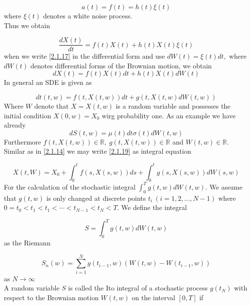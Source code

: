 \documentclass[a4 paper, 12pt]{report}
\theoremstyle{plain}
\begin{document}
\begin{equation}\label{2.1.16}
a(t)  = f(t)=h(t)\xi(t)
\end{equation}
where $\xi(t)$ denotes a white noise process.\\
Thus we obtain

\begin{equation}\label{2.1.17}
\frac{dX(t)}{dt} = f(t)X(t)+h(t)X(t)\xi(t)
\end{equation}
when we write \eqref{2.1.17} in the differential form and use $dW(t) = \xi(t)dt,$ where $dW(t)$ denotes differential forms of the Brownian motion, we obtain
\begin{equation}\label{2.1.18}
dX(t) = f(t)X(t)dt+h(t)X(t)dW(t)
\end{equation}
In general an SDE is given as


\begin{equation}\label{2.1.19}
dt(t,w) = f(t,X(t,w))dt+g(t,X(t,w)dW(t,w))
\end{equation}
Where $W$ denote that $X = X(t,w)$ is a random variable and possesses the initial condition $X(0,w) = X_0$ wirg probability one. As an example we have already %
$$
dS(t,w) = \mu(t)dt\sigma(t)dW(t,w)
$$
Furthermore $f(t,X(t,w))\in\mathbb{R},~g(t,X(t,w))\in\mathbb{R}$ and $W(t,w)\in\mathbb{R}$. Similar as in \eqref{2.1.14} we may write \eqref{2.1.19} as integral equation

\begin{equation}\label{2.1.20}
X(t,W) = X_0+\int_0^tf(s,X(s,w))ds+\int_0^t g(s,X(s,w))dW(s,w)
\end{equation}
For the calculation of the stochastic integral $\int_0^Tg(t,w)dW(t,w)$. We assume that $g(t,w)$ is only changed at discrete points $t_i ~(i = 1,2,\ldots,N-1)$ where $0 = t_0<t_1<t_1<\cdots<t_{N-1}<t_N<T$. We define the integral

\begin{equation}\label{2.4.21}
S = \int_0^Tg(t,w)dW(t,w)
\end{equation}
as the Riemann


\begin{equation}\label{2.1.22}
S_n(w) = \sum_{i = 1}^Ng(t_{i-1},w)(W(t,w) - W(t_{i-1},w))
\end{equation}
as $N\rightarrow\infty$\\
A random variable $S$ is called the Ito integral of a stochastic process $g(t_N)$ with respect to the Brownian motion $W(t,w)$ on the interval $[0,T]$ if
\end{document}
